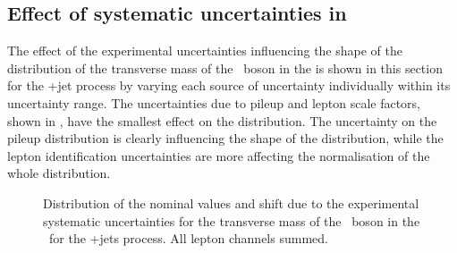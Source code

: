 \subsection{Effect of systematic uncertainties in \WZCR}
\label{sec:MTW}
The effect of the experimental uncertainties influencing the shape of the distribution of the transverse mass of the \PW\ boson in the \WZCR is shown in this section for the \WZ+jet process by varying each source of uncertainty individually within its uncertainty range. The uncertainties due to pileup and lepton scale factors, shown in , have the smallest effect on the distribution. The uncertainty on the pileup distribution is clearly influencing the shape of the distribution, while the lepton identification uncertainties are more affecting the normalisation of the whole distribution. 
\begin{figure}[htbp] 
	\centering 
	\caption{Distribution of the nominal values and shift due to the experimental systematic uncertainties for the transverse mass of the \PW\ boson in the \WZCR\ for the \WZ+jets process. All lepton channels summed.}
\label{fig:shiftMTW1}
\end{figure}

